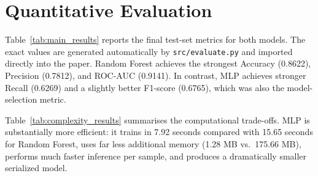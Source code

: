 \section{Quantitative Evaluation}
\label{sec:results}

Table~\ref{tab:main_results} reports the final test-set metrics for both models. The exact values are generated automatically by \texttt{src/evaluate.py} and imported directly into the paper. Random Forest achieves the strongest Accuracy (0.8622), Precision (0.7812), and ROC-AUC (0.9141). In contrast, MLP achieves stronger Recall (0.6269) and a slightly better F1-score (0.6765), which was also the model-selection metric.


Table~\ref{tab:complexity_results} summarises the computational trade-offs. MLP is substantially more efficient: it trains in 7.92 seconds compared with 15.65 seconds for Random Forest, uses far less additional memory (1.28 MB vs.\ 175.66 MB), performs much faster inference per sample, and produces a dramatically smaller serialized model.


